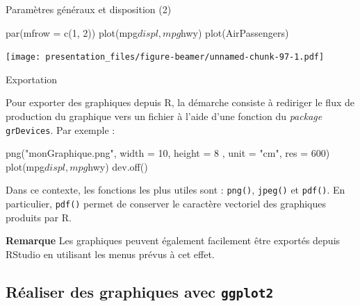 \documentclass[12pt,handout,ignorenonframetext,]{beamer}
\newenvironment{Shaded}{}{}
\newcommand{\KeywordTok}[1]{\textcolor[rgb]{0.00,0.00,1.00}{#1}}
\newcommand{\DataTypeTok}[1]{#1}
\newcommand{\DecValTok}[1]{#1}
\newcommand{\StringTok}[1]{\textcolor[rgb]{0.00,0.50,0.50}{#1}}
\newcommand{\OperatorTok}[1]{#1}
\newcommand{\NormalTok}[1]{#1}
\renewenvironment{Shaded}{\begin{snugshade}}{\end{snugshade}}
\begin{document}
\begin{frame}[fragile]{Paramètres généraux et disposition (2)}

\begin{Shaded}
\begin{Highlighting}[]
\KeywordTok{par}\NormalTok{(}\DataTypeTok{mfrow =} \KeywordTok{c}\NormalTok{(}\DecValTok{1}\NormalTok{, }\DecValTok{2}\NormalTok{))}
\KeywordTok{plot}\NormalTok{(mpg}\OperatorTok{$}\NormalTok{displ, mpg}\OperatorTok{$}\NormalTok{hwy)}
\KeywordTok{plot}\NormalTok{(AirPassengers)}
\end{Highlighting}
\end{Shaded}

\texttt{[image: presentation\_files/figure-beamer/unnamed-chunk-97-1.pdf]}

\end{frame}

\begin{frame}[fragile]{Exportation}

Pour exporter des graphiques depuis R, la démarche consiste à rediriger
le flux de production du graphique vers un fichier à l'aide d'une
fonction du \emph{package} \texttt{grDevices}. Par exemple :

\pause 

\begin{Shaded}
\begin{Highlighting}[]
\KeywordTok{png}\NormalTok{(}\StringTok{"monGraphique.png"}\NormalTok{, }\DataTypeTok{width =} \DecValTok{10}\NormalTok{, }\DataTypeTok{height =} \DecValTok{8}
\NormalTok{    , }\DataTypeTok{unit =} \StringTok{"cm"}\NormalTok{, }\DataTypeTok{res =} \DecValTok{600}\NormalTok{)}
\KeywordTok{plot}\NormalTok{(mpg}\OperatorTok{$}\NormalTok{displ, mpg}\OperatorTok{$}\NormalTok{hwy)}
\KeywordTok{dev.off}\NormalTok{()}
\end{Highlighting}
\end{Shaded}

\pause Dans ce contexte, les fonctions les plus utiles sont :
\texttt{png()}, \texttt{jpeg()} et \texttt{pdf()}. En particulier,
\texttt{pdf()} permet de conserver le caractère vectoriel des graphiques
produits par R.

\pause 

\textbf{Remarque} Les graphiques peuvent également facilement être
exportés depuis RStudio en utilisant les menus prévus à cet effet.

\end{frame}

\subsection{\texorpdfstring{Réaliser des graphiques avec
\protect\texttt{ggplot2}}{Réaliser des graphiques avec }}\label{realiser-des-graphiques-avec}
\end{document}
